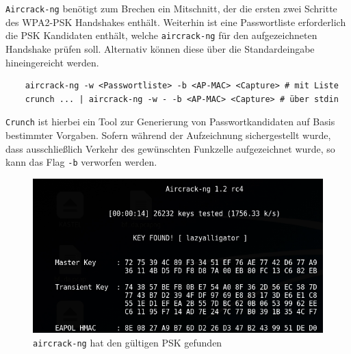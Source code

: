 \texttt{Aircrack-ng} benötigt zum Brechen ein Mitschnitt, der die ersten zwei Schritte des WPA2-PSK Handshakes enthält.
Weiterhin ist eine Passwortliste erforderlich die PSK Kandidaten enthält, welche \texttt{aircrack-ng} für den aufgezeichneten Handshake prüfen soll. Alternativ können diese über die Standardeingabe hineingereicht werden.
\begin{Verbatim}
	aircrack-ng -w <Passwortliste> -b <AP-MAC> <Capture> # mit Liste
	crunch ... | aircrack-ng -w - -b <AP-MAC> <Capture> # über stdin
\end{Verbatim}
\texttt{Crunch} ist hierbei ein Tool zur Generierung von Passwortkandidaten auf Basis bestimmter Vorgaben.
Sofern während der Aufzeichnung sichergestellt wurde, dass ausschließlich Verkehr des gewünschten Funkzelle aufgezeichnet wurde, so kann das Flag \texttt{-b} verworfen werden.

\begin{figure}[ht]
	\centering
	\includegraphics[width=\textwidth]{graphics/aircrack_success}
	\caption[Aircrack-ng]{\texttt{aircrack-ng} hat den gültigen PSK gefunden}
\end{figure}

\FloatBarrier